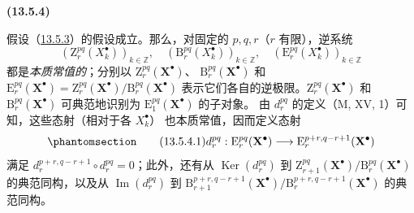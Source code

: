\documentclass[UTF8,fontset=none,11pt,oneside,openany]{ctexbook}
\newenvironment{env}[1][]{%
  \par\medskip\noindent\textbf{(#1)}\ %
}{\par}
\let\EGAOriginalLabel\label
\renewcommand{\label}[1]{\phantomsection\EGAOriginalLabel{#1}}
\begin{document}
\begin{env}[13.5.4]
\label{0.13.5.4-fr}
假设（\hyperref[0.13.5.3-fr]{13.5.3}）的假设成立。那么，对固定的
$p,q,r$（$r$ 有限），逆系统
\[
(\mathrm Z_r^{pq}(X_k^\bullet))_{k\in\mathbb Z},\quad
(\mathrm B_r^{pq}(X_k^\bullet))_{k\in\mathbb Z},\quad
(\mathrm E_r^{pq}(X_k^\bullet))_{k\in\mathbb Z}
\]
都是\emph{本质常值的}；分别以
$\mathrm Z_r^{pq}(\mathbf X^\bullet)$、
$\mathrm B_r^{pq}(\mathbf X^\bullet)$ 和
$\mathrm E_r^{pq}(\mathbf X^\bullet)=
\mathrm Z_r^{pq}(\mathbf X^\bullet)/ \mathrm B_r^{pq}(\mathbf X^\bullet)$
表示它们各自的逆极限。$\mathrm Z_r^{pq}(\mathbf X^\bullet)$ 和
$\mathrm B_r^{pq}(\mathbf X^\bullet)$ 可典范地识别为
$\mathrm E_1^{pq}(\mathbf X^\bullet)$ 的子对象。
由 $d_r^{pq}$ 的定义（M, XV, 1）可知，这些态射（相对于各 $X_k^\bullet$）
也本质常值，因而定义态射
\begin{equation}
\label{0.13.5.4.1-fr}
\tag{13.5.4.1}
d_r^{pq}:\mathrm E_r^{pq}(\mathbf X^\bullet)
\longrightarrow\mathrm E_r^{p+r,q-r+1}(\mathbf X^\bullet)
\end{equation}
满足 $d_r^{p+r,q-r+1}\circ d_r^{pq}=0$；此外，还有从
$\operatorname{Ker}(d_r^{pq})$ 到
$\mathrm Z_{r+1}^{pq}(\mathbf X^\bullet)/ \mathrm B_r^{pq}(\mathbf X^\bullet)$
的典范同构，以及从 $\operatorname{Im}(d_r^{pq})$ 到
$\mathrm B_{r+1}^{p+r,q-r+1}(\mathbf X^\bullet)/
\mathrm B_r^{p+r,q-r+1}(\mathbf X^\bullet)$ 的典范同构。
\end{env}
\end{document}
